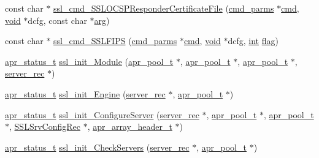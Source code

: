 \begin{DoxyCompactItemize}
\item 
const char $\ast$ \hyperlink{group__MOD__SSL__PRIVATE_gaa59ac03a2db9d1027ac7943c7e760159}{ssl\+\_\+cmd\+\_\+\+S\+S\+L\+O\+C\+S\+P\+Responder\+Certificate\+File} (\hyperlink{group__APACHE__CORE__CONFIG_ga1791fbd28d06a9847bad001541c5241e}{cmd\+\_\+parms} $\ast$\hyperlink{group__apr__thread__proc_ga7b715f5a87a71c6766684c1798251237}{cmd}, \hyperlink{group__MOD__ISAPI_gacd6cdbf73df3d9eed42fa493d9b621a6}{void} $\ast$dcfg, const char $\ast$\hyperlink{group__APACHE__CORE__MUTEX_gaf6517210150d97cd5cb8a17e3768770d}{arg})
\item 
const char $\ast$ \hyperlink{group__MOD__SSL__PRIVATE_ga25550ea970d97e41a0e4680c5eb4be1d}{ssl\+\_\+cmd\+\_\+\+S\+S\+L\+F\+I\+PS} (\hyperlink{group__APACHE__CORE__CONFIG_ga1791fbd28d06a9847bad001541c5241e}{cmd\+\_\+parms} $\ast$\hyperlink{group__apr__thread__proc_ga7b715f5a87a71c6766684c1798251237}{cmd}, \hyperlink{group__MOD__ISAPI_gacd6cdbf73df3d9eed42fa493d9b621a6}{void} $\ast$dcfg, \hyperlink{pcre_8txt_a42dfa4ff673c82d8efe7144098fbc198}{int} \hyperlink{group__apr__mmap_gac9ec9a6de38e93927dca656ab65d0087}{flag})
\item 
\hyperlink{group__apr__errno_gaa5105fa83cc322f09382292db8b47593}{apr\+\_\+status\+\_\+t} \hyperlink{group__MOD__SSL__PRIVATE_ga4aa47e22efe0b853cf31c3e8e9a7c70c}{ssl\+\_\+init\+\_\+\+Module} (\hyperlink{structapr__pool__t}{apr\+\_\+pool\+\_\+t} $\ast$, \hyperlink{structapr__pool__t}{apr\+\_\+pool\+\_\+t} $\ast$, \hyperlink{structapr__pool__t}{apr\+\_\+pool\+\_\+t} $\ast$, \hyperlink{structserver__rec}{server\+\_\+rec} $\ast$)
\item 
\hyperlink{group__apr__errno_gaa5105fa83cc322f09382292db8b47593}{apr\+\_\+status\+\_\+t} \hyperlink{group__MOD__SSL__PRIVATE_gac18ba5fa4fd9e4dc94dc25a2e3823169}{ssl\+\_\+init\+\_\+\+Engine} (\hyperlink{structserver__rec}{server\+\_\+rec} $\ast$, \hyperlink{structapr__pool__t}{apr\+\_\+pool\+\_\+t} $\ast$)
\item 
\hyperlink{group__apr__errno_gaa5105fa83cc322f09382292db8b47593}{apr\+\_\+status\+\_\+t} \hyperlink{group__MOD__SSL__PRIVATE_gad251ffd8ea9f31b8f2fd5333c9261b82}{ssl\+\_\+init\+\_\+\+Configure\+Server} (\hyperlink{structserver__rec}{server\+\_\+rec} $\ast$, \hyperlink{structapr__pool__t}{apr\+\_\+pool\+\_\+t} $\ast$, \hyperlink{structapr__pool__t}{apr\+\_\+pool\+\_\+t} $\ast$, \hyperlink{structSSLSrvConfigRec}{S\+S\+L\+Srv\+Config\+Rec} $\ast$, \hyperlink{structapr__array__header__t}{apr\+\_\+array\+\_\+header\+\_\+t} $\ast$)
\item 
\hyperlink{group__apr__errno_gaa5105fa83cc322f09382292db8b47593}{apr\+\_\+status\+\_\+t} \hyperlink{group__MOD__SSL__PRIVATE_ga14e99b39c5c1ebf015f8d3e8fdd0ca70}{ssl\+\_\+init\+\_\+\+Check\+Servers} (\hyperlink{structserver__rec}{server\+\_\+rec} $\ast$, \hyperlink{structapr__pool__t}{apr\+\_\+pool\+\_\+t} $\ast$)

\end{DoxyCompactItemize}
